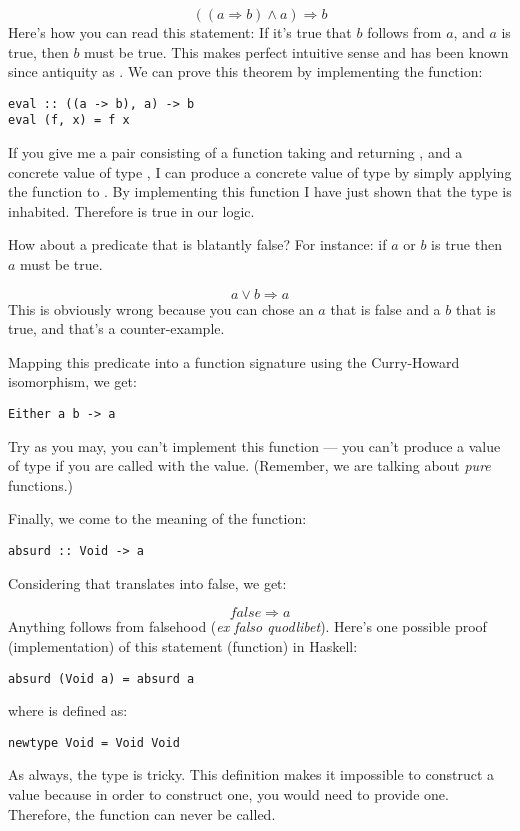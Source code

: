 \[((a \Rightarrow b) \wedge a) \Rightarrow b\]
Here's how you can read this statement: If it's true that $b$
follows from $a$, and $a$ is true, then $b$ must be
true. This makes perfect intuitive sense and has been known since
antiquity as . We can prove this theorem by
implementing the function:

\begin{Verbatim}
eval :: ((a -> b), a) -> b
eval (f, x) = f x
\end{Verbatim}
If you give me a pair consisting of a function  taking
 and returning , and a concrete value  of
type , I can produce a concrete value of type  by
simply applying the function  to . By implementing
this function I have just shown that the type
 is inhabited.
Therefore  is true in our logic.

How about a predicate that is blatantly false? For instance: if
$a$ or $b$ is true then $a$ must be true.

\[a \vee b \Rightarrow a\]
This is obviously wrong because you can chose an $a$ that is
false and a $b$ that is true, and that's a counter-example.

Mapping this predicate into a function signature using the Curry-Howard
isomorphism, we get:

\begin{Verbatim}
Either a b -> a
\end{Verbatim}
Try as you may, you can't implement this function --- you can't produce
a value of type  if you are called with the 
value. (Remember, we are talking about \emph{pure} functions.)

Finally, we come to the meaning of the  function:

\begin{Verbatim}
absurd :: Void -> a
\end{Verbatim}
Considering that  translates into false, we get:

\[false \Rightarrow a\]
Anything follows from falsehood (\emph{ex falso quodlibet}). Here's one
possible proof (implementation) of this statement (function) in Haskell:

\begin{Verbatim}
absurd (Void a) = absurd a
\end{Verbatim}
where  is defined as:

\begin{Verbatim}
newtype Void = Void Void
\end{Verbatim}
As always, the type  is tricky. This definition makes it
impossible to construct a value because in order to construct one, you
would need to provide one. Therefore, the function  can
never be called.

